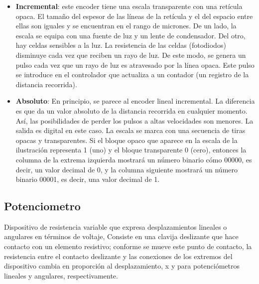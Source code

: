\begin{itemize}

	\item \textbf{Incremental}: este encoder tiene una escala transparente con una retícula opaca. El tamaño del espesor de las líneas de la retícula y el del espacio entre ellas son iguales y se encuentran en el rango de micrones. De un lado, la escala se equipa con una fuente de luz y un lente de condensador. Del otro, hay celdas sensibles a la luz. La resistencia de las celdas (fotodiodos) disminuye cada vez que reciben un rayo de luz. De este modo, se genera un pulso cada vez que un rayo de luz es atravesado por la línea opaca. Este pulso se introduce en el controlador que actualiza a un contador (un registro de la distancia recorrida).
	
	\item \textbf{Absoluto}: En principio, se parece al encoder lineal incremental. La diferencia es que da un valor absoluto de la distancia recorrida en cualquier momento. Así, las posibilidades de perder los pulsos a altas velocidades son menores. La salida es digital en este caso. La escala se marca con una secuencia de tiras opacas y transparentes. Si el bloque opaco que aparece en la escala de la ilustración representa 1 (uno) y el bloque transparente 0 (cero), entonces la columna de la extrema izquierda mostrará un número binario cómo 00000, es decir, un valor decimal de 0, y la columna siguiente mostrará un número binario 00001, es decir, una valor decimal de 1.
\end{itemize}

\subsection*{\quad\textbf{Potenciometro}}
Dispositivo de resistencia variable que expresa desplazamientos lineales o angulares en términos de voltaje, Consiste en una clavija deslizante que hace contacto con un elemento resistivo; conforme se mueve este punto de contacto, la resistencia entre el contacto deslizante y las conexiones de los extremos del dispositivo cambia en proporción al desplazamiento, x y  para potenciómetros lineales y angulares, respectivamente.

